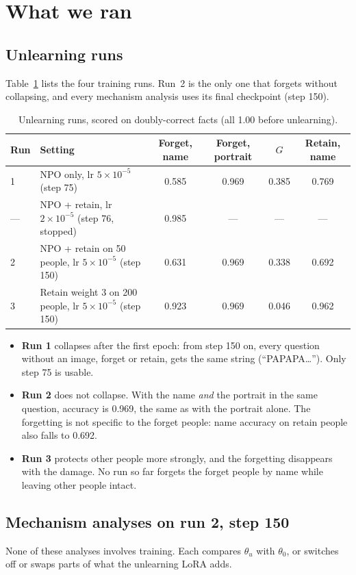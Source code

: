 \documentclass[11pt]{article}
\newcommand{\thu}{\theta_u}
\newcommand{\tho}{\theta_0}
\begin{document}
\section{What we ran}
\subsection{Unlearning runs}
Table~\ref{tab:runs} lists the four training runs. Run~2 is the only one that forgets
without collapsing, and every mechanism analysis uses its final checkpoint (step 150).

\begin{table}[htbp]
\centering\small
\begin{tabularx}{\linewidth}{@{}lXcccc@{}}
\toprule
Run & Setting & Forget, name & Forget, portrait & $G$ & Retain, name\\
\midrule
1 & NPO only, lr $5\times10^{-5}$ (step 75) & 0.585 & 0.969 & 0.385 & 0.769\\
--- & NPO + retain, lr $2\times10^{-5}$ (step 76, stopped) & 0.985 & --- & --- & ---\\
2 & NPO + retain on 50 people, lr $5\times10^{-5}$ (step 150) & 0.631 & 0.969 & 0.338 & 0.692\\
3 & Retain weight 3 on 200 people, lr $5\times10^{-5}$ (step 150) & 0.923 & 0.969 & 0.046 & 0.962\\
\bottomrule
\end{tabularx}
\caption{Unlearning runs, scored on doubly-correct facts (all 1.00 before unlearning).}
\label{tab:runs}
\end{table}

\begin{itemize}
\item \textbf{Run 1} collapses after the first epoch: from step 150 on, every question
without an image, forget or retain, gets the same string (``PAPAPA\ldots''). Only step 75
is usable.
\item \textbf{Run 2} does not collapse. With the name \emph{and} the portrait in the same
question, accuracy is 0.969, the same as with the portrait alone. The forgetting is not
specific to the forget people: name accuracy on retain people also falls to 0.692.
\item \textbf{Run 3} protects other people more strongly, and the forgetting disappears
with the damage. No run so far forgets the forget people by name while leaving other
people intact.
\end{itemize}

\subsection{Mechanism analyses on run 2, step 150}
None of these analyses involves training. Each compares $\thu$ with $\tho$, or switches
off or swaps parts of what the unlearning LoRA adds.
\end{document}
